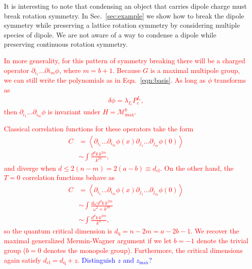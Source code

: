 \documentclass[pra,aps,twocolumn, amsfonts,amsmath,amssymb,nofootinbib,superscriptaddress]{revtex4}
\newcommand{\note}[1]{\textcolor{red}{#1}}
\newcommand{\charlie}[1]{\textcolor{Blue}{#1}}
\newcommand{\nn}{\nonumber\\}
\renewcommand{\max}{\text{max}}
\newcommand{\cl}{\text{cl}}
\begin{document}

It is interesting to note that condensing an object that carries dipole charge must break rotation symmetry. In Sec.~\ref{sec:example} we show how to break the dipole symmetry while preserving a lattice rotation symmetry by considering multiple species of dipole. We are not aware of a way to condense a dipole while preserving continuous rotation symmetry.

\note{In more generality, for this pattern of symmetry breaking there will be a charged operator $\partial_{i_1} \dots \partial{i_m} \phi$, where $m=b+1$. Because $G$ is a maximal multipole group, we can still write the polynomials as in Eqn.~\ref{eqn:basis}. As long as $\phi$ transforms as 
\begin{align}
\delta \phi = \lambda_{I_c} P_c^{I_c}, \label{eqn:partial}
\end{align}
then $\partial_{i_1} \dots \partial_{i_m} \phi$ is invariant under $H=\mathcal{M}^b_\max$. }

\note{Classical correlation functions for these operators take the form
\begin{align}
C &= \left\langle \partial_{i_1} \dots \partial_{i_m} \phi(x) \partial_{j_1} \dots \partial_{j_m} \phi(0) \right\rangle \nn
&\sim \int \frac{d^dk\, k^{2m}}{k^{2n}},
\end{align}
and diverge when $d \le 2(n-m) = 2(a-b)\equiv d_\text{cl}$. On the other hand, the $T=0$ correlation functions behave as
\begin{align}
C &= \left\langle \partial_{i_1} \dots \partial_{i_m} \phi(x) \partial_{j_1} \dots \partial_{j_m} \phi(0) \right\rangle \nn
&\sim \int \frac{d\omega\, d^dk\, k^{2m}}{\omega^2 + k^{2n}}\nn
&\sim \int \frac{d^dk\, k^{2m}}{k^n},
\end{align}
so the quantum critical dimension is $d_\text{q} = n - 2m = a - 2b - 1$. We recover the maximal generalized Mermin-Wagner argument if we let $b=-1$ denote the trivial group ($b=0$ denotes the monopole group). Furthermore, the critical dimensions again satisfy $d_\cl = d_\text{q} + z$. \charlie{Distinguish $z$ and $z_\max$?}
}

\end{document}
